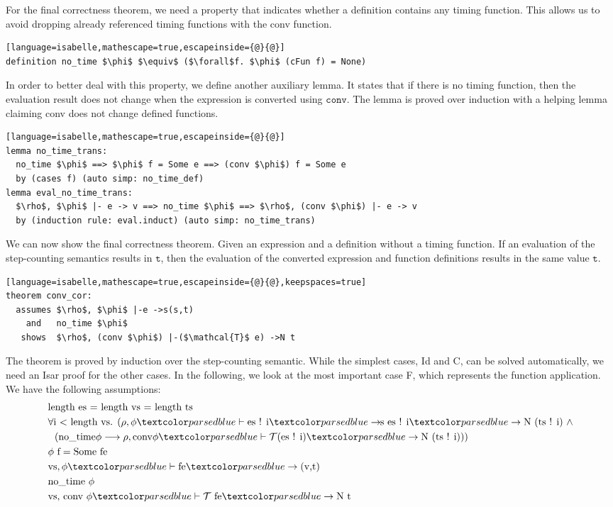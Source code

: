 For the final correctness theorem, we need a property that indicates whether a definition contains any timing function.
This allows us to avoid dropping already referenced timing functions with the conv function.
\begin{lstlisting}[language=isabelle,mathescape=true,escapeinside={@}{@}]
definition no_time $\phi$ $\equiv$ ($\forall$f. $\phi$ (cFun f) = None)
\end{lstlisting}

In order to better deal with this property, we define another auxiliary lemma.
It states that if there is no timing function, then the evaluation result does not change when the expression is converted using $\texttt{conv}$.
The lemma is proved over induction with a helping lemma claiming conv does not change defined functions.
\begin{lstlisting}[language=isabelle,mathescape=true,escapeinside={@}{@}]
lemma no_time_trans:
  no_time $\phi$ ==> $\phi$ f = Some e ==> (conv $\phi$) f = Some e
  by (cases f) (auto simp: no_time_def)
lemma eval_no_time_trans:
  $\rho$, $\phi$ |- e -> v ==> no_time $\phi$ ==> $\rho$, (conv $\phi$) |- e -> v
  by (induction rule: eval.induct) (auto simp: no_time_trans)
\end{lstlisting}

We can now show the final correctness theorem.
Given an expression and a definition without a timing function.
If an evaluation of the step-counting semantics results in $\texttt{t}$, then the evaluation of the converted expression and function definitions results in the same value $\texttt{t}$.
\begin{lstlisting}[language=isabelle,mathescape=true,escapeinside={@}{@},keepspaces=true]
theorem conv_cor:
  assumes $\rho$, $\phi$ |-e ->s(s,t)
    and   no_time $\phi$
   shows  $\rho$, (conv $\phi$) |-($\mathcal{T}$ e) ->N t
\end{lstlisting}

The theorem is proved by induction over the step-counting semantic.
While the simplest cases, Id and C, can be solved automatically, we need an Isar proof for the other cases.
In the following, we look at the most important case F, which represents the function application.
We have the following assumptions:
\begin{align}
  &\text{length es = length vs = length ts} \label{cor:len}\\
  &\forall\text{i < length vs. } (\rho, \phi \hvdash \text{es ! i} \hrightarrows \text{es ! i} \hrightarrow \text{N (ts ! i)}\ \land \label{cor:args}\\
  &\ \ (\text{no\_time} \phi \longrightarrow \rho, \text{conv} \phi \hvdash \mathcal{T} \text{(es ! i)} \hrightarrow \text{N (ts ! i)}))\nonumber\\
  &\phi\ \text{f} = \text{Some fe} \label{cor:phi}\\
  &\text{vs}, \phi \hvdash \text{fe} \hrightarrow \text{(v,t)} \label{cor:feeval}\\
  &\text{no\_time}\ \phi \label{cor:notime}\\
  &\text{vs, conv}\ \phi \hvdash \mathcal{T}\ \text{fe} \hrightarrow \text{N t} \label{cor:Tfeeval}
\end{align}

